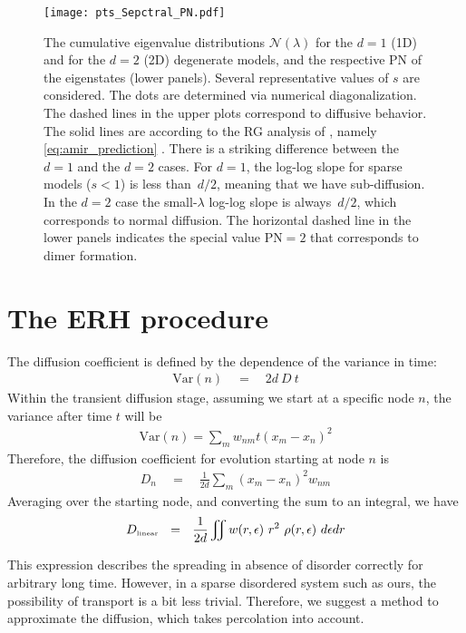 \begin{figure}
\texttt{[image: pts\_Sepctral\_PN.pdf]}

\caption{ 
The cumulative eigenvalue distributions $\mathcal{N}(\lambda)$ 
for the $d{=}1$ (1D) and for the $d{=}2$ (2D) degenerate models, 
and the respective PN of the eigenstates (lower panels).
Several representative values of $s$ are considered.
% 
The dots are determined via numerical diagonalization. 
The dashed lines in the upper plots correspond to diffusive behavior.  
The solid lines are according to the RG analysis of 
\cite{amir_localization_2010,*amir_mean-field_2008}, namely 
\autoref{eq:amir_prediction} . 
%
There is a striking difference between the $d{=}1$ and the $d{=}2$ cases. 
For $d{=}1$, the log-log slope for sparse models ($s<1$) is less than~$d/2$, 
meaning that we have sub-diffusion. In the $d{=}2$ case the small-$\lambda$ log-log slope 
is always~$d/2$, which corresponds to normal diffusion.
%
The horizontal dashed line in the lower panels indicates 
the special value PN$=2$ that corresponds to dimer formation.
} 
\label{fig:spectral}
\end{figure}

\section{The ERH procedure}

The diffusion coefficient is defined by the dependence
of the variance in time:
%
\begin{align}
\textrm{Var}(n) \quad =\quad 2d\ D\ t
\end{align}
%
Within the transient diffusion stage,
assuming we start at a specific node $n$, the variance after time
$t$ will be
%
\begin{align}
\textrm{Var}(n) = \sum_m w_{nm} t (x_m-x_n)^2
\end{align}
Therefore, the diffusion coefficient for evolution 
starting at node $n$ is
%
\begin{align}
D_n \quad=\quad \frac{1}{2d}\sum_m (x_m-x_n)^2 w_{nm}
\end{align}
%
Averaging over the starting node, and converting the sum to an integral,
we have
%
\begin{align}\label{eq:linear_D}
D_{\tbox{linear}}  \ \ = \ \ \frac{1}{2d}\iint w(r,\epsilon) \ r^2  \ \rho(r,\epsilon) \ d\epsilon dr 
\end{align}
%

This expression describes the spreading in absence of disorder correctly
for arbitrary long time. However, in a sparse disordered system such as ours,
the possibility of transport is a bit less trivial. Therefore, we suggest
a method to approximate the diffusion, which takes percolation into account.


